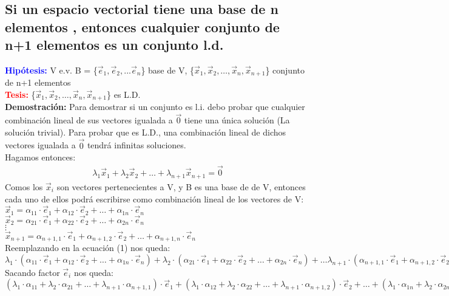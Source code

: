 \documentclass{article}
\begin{document}
\subsection{Si un espacio vectorial tiene una  base de n 
elementos , entonces cualquier conjunto de n+1 
elementos es un conjunto l.d.}
{\bfseries \textcolor{blue}{Hipótesis:}} V e.v. B = \{$\vec{e}_{1}, \vec{e}_2,... \vec{e}_n $\} base de V, \{$\vec{x}_{1}, \vec{x}_2,\hdots, \vec{x}_n, \vec{x}_{n+1} $\} conjunto de n+1 elementos\\
{\bfseries \textcolor{red}{Tesis:}} \{$\vec{x}_{1}, \vec{x}_2,\hdots, \vec{x}_n, \vec{x}_{n+1} $\} es L.D.\\
{\bfseries Demostración:} Para demostrar si un conjunto es l.i.  debo probar 
que cualquier combinación lineal de sus vectores igualada a $\vec{0}$ tiene una única solución (La solución trivial). Para probar que es L.D., una combinación lineal de dichos vectores igualada a $\vec{0}$ tendrá infinitas soluciones. \\ Hagamos entonces: 
\begin{align}
\lambda_1\vec{x}_1+\lambda_2\vec{x}_2+\hdots+\lambda_{n+1}\vec{x}_{n+1} = \vec{0}
\end{align}
Comos los $\vec{x}_i$ son vectores pertenecientes a V, y B es una base de de V, entonces cada uno de ellos podrá escribirse como combinación lineal de los vectores de V:\\
$\vec{x}_1=\alpha_{11}\cdot\vec{e}_1+\alpha_{12}\cdot\vec{e}_2+\hdots+\alpha_{1n}\cdot\vec{e}_n$\\
$\vec{x}_2=\alpha_{21}\cdot\vec{e}_1+\alpha_{22}\cdot\vec{e}_2+\hdots+\alpha_{2n}\cdot\vec{e}_n$\\
$\vdots$\\
$\vec{x}_{n+1}=\alpha_{n+1,1}\cdot\vec{e}_1+\alpha_{n+1,2}\cdot\vec{e}_2+\hdots+\alpha_{n+1,n}\cdot\vec{e}_n$\\
Reemplazando en la ecuación (1) nos queda:\\
$\lambda_1\cdot(\alpha_{11}\cdot\vec{e}_1+\alpha_{12}\cdot\vec{e}_2+\hdots+\alpha_{1n}\cdot\vec{e}_n) + \lambda_2\cdot(\alpha_{21}\cdot\vec{e}_1+\alpha_{22}\cdot\vec{e}_2+\hdots+\alpha_{2n}\cdot\vec{e}_n) + \hdots \lambda_{n+1}\cdot(\alpha_{n+1,1}\cdot\vec{e}_1+\alpha_{n+1,2}\cdot\vec{e}_2+\hdots+\alpha_{n+1,n}\cdot\vec{e}_n)$\\
Sacando factor $\vec{e}_i$ nos queda:
$(\lambda_1\cdot\alpha_{11} + \lambda_2\cdot\alpha_{21} + \hdots + \lambda_{n+1}\cdot\alpha_{n+1,1})\cdot\vec{e}_1 + (\lambda_1\cdot\alpha_{12} + \lambda_2\cdot\alpha_{22} + \hdots + \lambda_{n+1}\cdot\alpha_{n+1,2})\cdot\vec{e}_2 + \hdots + (\lambda_1\cdot\alpha_{1n} + \lambda_2\cdot\alpha_{2n} + \hdots + \lambda_{n+1}\cdot\alpha_{n+1,n})\cdot\vec{e}_n$\\
\end{document}
